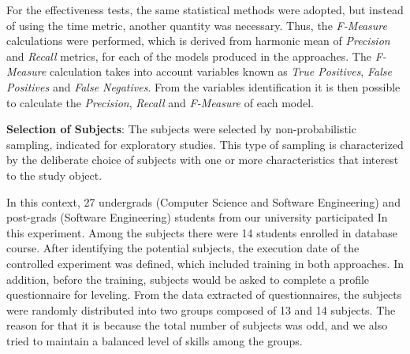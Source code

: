 \documentclass[a4paper,twoside,anonymous]{article}
\begin{document}
For the effectiveness tests, the same statistical methods were adopted, but instead of using the time metric, another quantity was necessary.
Thus, the \textit{F-Measure} 
calculations were performed, which is derived from harmonic mean of \textit{Precision} and \textit{Recall} metrics, for each of the models produced in the approaches.
The \textit{F-Measure} \citep{Derczynski:2016} calculation takes into account variables known as \textit{True Positives}, \textit{False Positives} and \textit{False Negatives}.
From the variables identification it is then possible to calculate the \textit{Precision}, \textit{Recall} and \textit{F-Measure} of each model.


\textbf{Selection of Subjects}: The subjects were selected by non-probabilistic sampling, indicated for exploratory studies.
This type of sampling is characterized by the deliberate choice of subjects with one or more characteristics that interest to the study object.

In this context, 27 undergrads (Computer Science and Software Engineering) and post-grads (Software Engineering) students from our university participated In this experiment.
Among the subjects there were 14 students enrolled in database course.
After identifying the potential subjects, the execution date of the controlled experiment was defined, which included training in both approaches.
In addition, before the training, subjects would be asked to complete a profile questionnaire for leveling.
From the data extracted of questionnaires, the subjects were randomly distributed into two groups composed of 13 and 14 subjects. 
The reason for that it is because the total number of subjects was odd, and we also tried to maintain a balanced level of skills among the groups.
\end{document}
